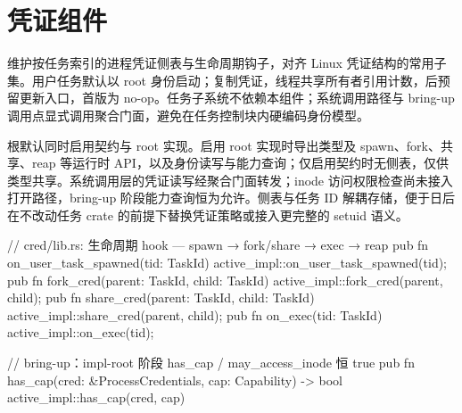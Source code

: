 
\section{凭证组件}

维护按任务索引的进程凭证侧表与生命周期钩子，对齐 Linux 凭证结构的常用子集。用户任务默认以 root 身份启动；复制凭证，线程共享所有者引用计数，后预留更新入口，首版为 no-op。任务子系统不依赖本组件；系统调用路径与 bring-up 调用点显式调用聚合门面，避免在任务控制块内硬编码身份模型。

根默认同时启用契约与 root 实现。启用 root 实现时导出类型及 spawn、fork、共享、reap 等运行时 API，以及身份读写与能力查询；仅启用契约时无侧表，仅供类型共享。系统调用层的凭证读写经聚合门面转发；inode 访问权限检查尚未接入打开路径，bring-up 阶段能力查询恒为允许。侧表与任务 ID 解耦存储，便于日后在不改动任务 crate 的前提下替换凭证策略或接入更完整的 setuid 语义。

\begin{rustcode}
// cred/lib.rs: 生命周期 hook — spawn → fork/share → exec → reap
pub fn on_user_task_spawned(tid: TaskId) { active_impl::on_user_task_spawned(tid); }
pub fn fork_cred(parent: TaskId, child: TaskId) { active_impl::fork_cred(parent, child); }
pub fn share_cred(parent: TaskId, child: TaskId) { active_impl::share_cred(parent, child); }
pub fn on_exec(tid: TaskId) { active_impl::on_exec(tid); }
\end{rustcode}

\begin{rustcode}
// bring-up：impl-root 阶段 has_cap / may_access_inode 恒 true
pub fn has_cap(cred: &ProcessCredentials, cap: Capability) -> bool {
    active_impl::has_cap(cred, cap)
}
\end{rustcode}
